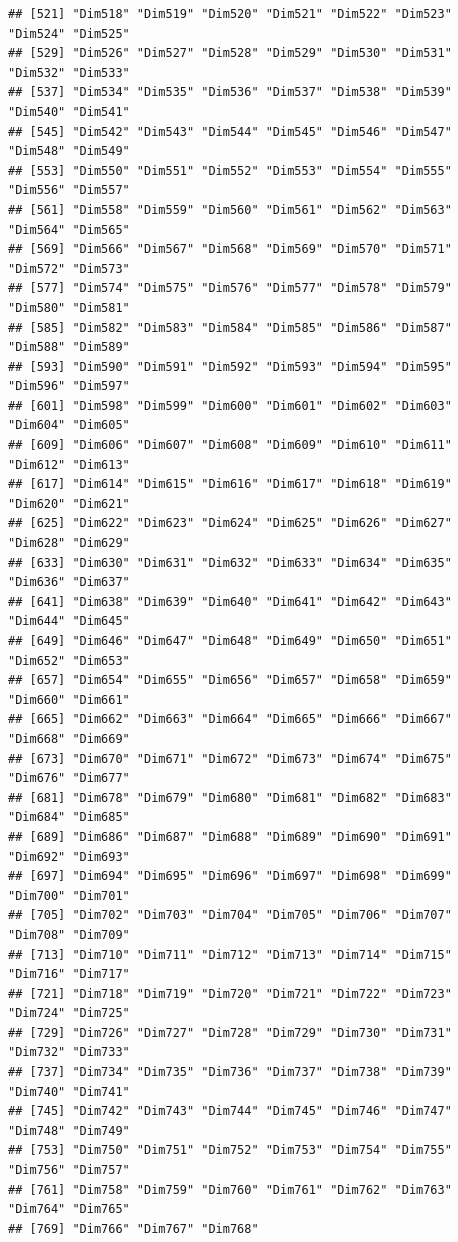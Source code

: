 \documentclass[
  english,
  man]{apa6}
\begin{document}
\begin{verbatim}
## [521] "Dim518" "Dim519" "Dim520" "Dim521" "Dim522" "Dim523" "Dim524" "Dim525"
## [529] "Dim526" "Dim527" "Dim528" "Dim529" "Dim530" "Dim531" "Dim532" "Dim533"
## [537] "Dim534" "Dim535" "Dim536" "Dim537" "Dim538" "Dim539" "Dim540" "Dim541"
## [545] "Dim542" "Dim543" "Dim544" "Dim545" "Dim546" "Dim547" "Dim548" "Dim549"
## [553] "Dim550" "Dim551" "Dim552" "Dim553" "Dim554" "Dim555" "Dim556" "Dim557"
## [561] "Dim558" "Dim559" "Dim560" "Dim561" "Dim562" "Dim563" "Dim564" "Dim565"
## [569] "Dim566" "Dim567" "Dim568" "Dim569" "Dim570" "Dim571" "Dim572" "Dim573"
## [577] "Dim574" "Dim575" "Dim576" "Dim577" "Dim578" "Dim579" "Dim580" "Dim581"
## [585] "Dim582" "Dim583" "Dim584" "Dim585" "Dim586" "Dim587" "Dim588" "Dim589"
## [593] "Dim590" "Dim591" "Dim592" "Dim593" "Dim594" "Dim595" "Dim596" "Dim597"
## [601] "Dim598" "Dim599" "Dim600" "Dim601" "Dim602" "Dim603" "Dim604" "Dim605"
## [609] "Dim606" "Dim607" "Dim608" "Dim609" "Dim610" "Dim611" "Dim612" "Dim613"
## [617] "Dim614" "Dim615" "Dim616" "Dim617" "Dim618" "Dim619" "Dim620" "Dim621"
## [625] "Dim622" "Dim623" "Dim624" "Dim625" "Dim626" "Dim627" "Dim628" "Dim629"
## [633] "Dim630" "Dim631" "Dim632" "Dim633" "Dim634" "Dim635" "Dim636" "Dim637"
## [641] "Dim638" "Dim639" "Dim640" "Dim641" "Dim642" "Dim643" "Dim644" "Dim645"
## [649] "Dim646" "Dim647" "Dim648" "Dim649" "Dim650" "Dim651" "Dim652" "Dim653"
## [657] "Dim654" "Dim655" "Dim656" "Dim657" "Dim658" "Dim659" "Dim660" "Dim661"
## [665] "Dim662" "Dim663" "Dim664" "Dim665" "Dim666" "Dim667" "Dim668" "Dim669"
## [673] "Dim670" "Dim671" "Dim672" "Dim673" "Dim674" "Dim675" "Dim676" "Dim677"
## [681] "Dim678" "Dim679" "Dim680" "Dim681" "Dim682" "Dim683" "Dim684" "Dim685"
## [689] "Dim686" "Dim687" "Dim688" "Dim689" "Dim690" "Dim691" "Dim692" "Dim693"
## [697] "Dim694" "Dim695" "Dim696" "Dim697" "Dim698" "Dim699" "Dim700" "Dim701"
## [705] "Dim702" "Dim703" "Dim704" "Dim705" "Dim706" "Dim707" "Dim708" "Dim709"
## [713] "Dim710" "Dim711" "Dim712" "Dim713" "Dim714" "Dim715" "Dim716" "Dim717"
## [721] "Dim718" "Dim719" "Dim720" "Dim721" "Dim722" "Dim723" "Dim724" "Dim725"
## [729] "Dim726" "Dim727" "Dim728" "Dim729" "Dim730" "Dim731" "Dim732" "Dim733"
## [737] "Dim734" "Dim735" "Dim736" "Dim737" "Dim738" "Dim739" "Dim740" "Dim741"
## [745] "Dim742" "Dim743" "Dim744" "Dim745" "Dim746" "Dim747" "Dim748" "Dim749"
## [753] "Dim750" "Dim751" "Dim752" "Dim753" "Dim754" "Dim755" "Dim756" "Dim757"
## [761] "Dim758" "Dim759" "Dim760" "Dim761" "Dim762" "Dim763" "Dim764" "Dim765"
## [769] "Dim766" "Dim767" "Dim768"
\end{verbatim}
\end{document}
